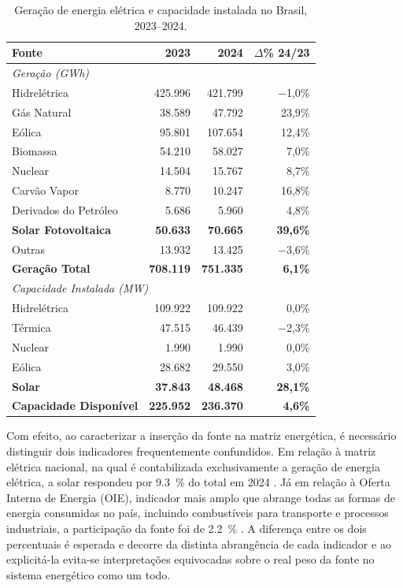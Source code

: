 \begin{table}[htbp]
\centering
\caption{Geração de energia elétrica e capacidade instalada no Brasil, 2023--2024.}
\label{tab:matriz_energetica}
\begin{tabular}{lrrr}
\hline
\textbf{Fonte} & \textbf{2023} & \textbf{2024} & \textbf{$\Delta$\% 24/23} \\
\hline
\multicolumn{4}{l}{\textit{Geração (GWh)}} \\
\hline
Hidrelétrica          & 425.996 & 421.799 & $-$1,0\% \\
Gás Natural           &  38.589 &  47.792 & 23,9\%   \\
Eólica                &  95.801 & 107.654 & 12,4\%   \\
Biomassa              &  54.210 &  58.027 &  7,0\%   \\
Nuclear               &  14.504 &  15.767 &  8,7\%   \\
Carvão Vapor          &   8.770 &  10.247 & 16,8\%   \\
Derivados do Petróleo &   5.686 &   5.960 &  4,8\%   \\
\textbf{Solar Fotovoltaica} & \textbf{50.633} & \textbf{70.665} & \textbf{39,6\%} \\
Outras                &  13.932 &  13.425 & $-$3,6\% \\
\textbf{Geração Total}& \textbf{708.119} & \textbf{751.335} & \textbf{6,1\%} \\
\hline
\multicolumn{4}{l}{\textit{Capacidade Instalada (MW)}} \\
\hline
Hidrelétrica          & 109.922 & 109.922 &  0,0\%   \\
Térmica               &  47.515 &  46.439 & $-$2,3\% \\
Nuclear               &   1.990 &   1.990 &  0,0\%   \\
Eólica                &  28.682 &  29.550 &  3,0\%   \\
\textbf{Solar}        & \textbf{37.843} & \textbf{48.468} & \textbf{28,1\%} \\
\textbf{Capacidade Disponível} & \textbf{225.952} & \textbf{236.370} & \textbf{4,6\%} \\
\hline
\end{tabular}
\end{table}

Com efeito, ao caracterizar a inserção da fonte na matriz energética, é necessário distinguir
dois indicadores frequentemente confundidos. Em relação à matriz elétrica
nacional, na qual é contabilizada exclusivamente a geração de energia elétrica, a
solar respondeu por \SI{9,3}{\percent} do total em 2024 \cite{EPE2025}. Já em
relação à Oferta Interna de Energia (OIE), indicador mais amplo que abrange todas
as formas de energia consumidas no país, incluindo combustíveis para transporte e
processos industriais, a participação da fonte foi de \SI{2,2}{\percent}
\cite{EPE2025}. A diferença entre os dois percentuais é esperada e decorre da distinta abrangência de cada indicador e ao explicitá-la evita-se interpretações equivocadas sobre o real peso da fonte no sistema energético como um todo.

